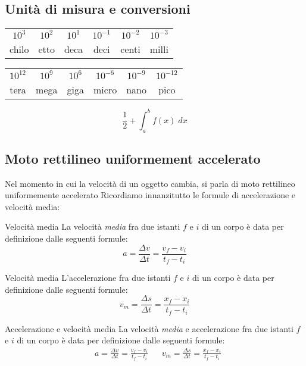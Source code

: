 \subsection{Unità di misura e conversioni}
\begin{center}
	\begin{tabular}{ c c c c c c}
		\toprule
		$ 10^3 $ & $ 10^{2} $ & $ 10^{1} $ & $ 10^{-1} $ & $ 10^{-2} $ & $ 10^{-3} $ \\
		chilo    & etto       & deca       & deci        & centi       & milli       \\
		\bottomrule
	\end{tabular}
	\vskip3mm
	\begin{tabular}{ c c c c c c}
		\toprule
		$ 10^{12} $ & $ 10^{9} $ & $ 10^{6} $ & $ 10^{-6} $ & $ 10^{-9} $ & $ 10^{-12} $ \\
		tera        & mega       & giga       & micro       & nano        & pico         \\
		\bottomrule
	\end{tabular}
\end{center}
\[
	\frac{1}{2} + \int_{a}^{b} f(x) \; dx
\]
\subsection{Moto rettilineo uniformement accelerato}
Nel momento in cui la velocità di un oggetto cambia, si parla di moto rettilineo uniformemente accelerato
Ricordiamo innanzitutto le formule di accelerazione e velocità media:
\begin{minipage}[t]{0.48\textwidth}
	\begin{definizione}{Velocità media}
		La velocità \textit{media}  fra due istanti $ f $ e $ i $ di un corpo è data per definizione dalle seguenti formule:
		\[
			a = \frac{\Delta v}{\Delta t} = \frac{v_f - v_i}{t_f - t_i}
		\]
	\end{definizione}

\end{minipage}
\hfill
%
\begin{minipage}[t]{0.48\textwidth}
	\begin{definizione}{Velocità media}
		L'accelerazione  fra due istanti $ f $ e $ i $ di un corpo è data per definizione dalle seguenti formule:
		\[
			v_m = \frac{\Delta s}{\Delta t} =  \frac{x_f - x_i}{t_f - t_i}
		\]
	\end{definizione}

\end{minipage}
\begin{definizione}{Accelerazione e velocità media}
	La velocità \textit{media} e accelerazione fra due istanti $ f $ e $ i $ di un corpo è data per definizione dalle seguenti formule:
	\begin{align*}
		 & a = \frac{\Delta v}{\Delta t} = \frac{v_f - v_i}{t_f - t_i} &  & v_m = \frac{\Delta s}{\Delta t} =  \frac{x_f - x_i}{t_f - t_i}
	\end{align*}

\end{definizione}

